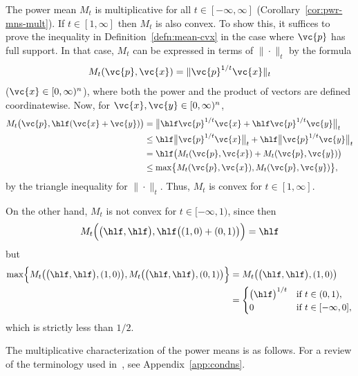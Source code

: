 \begin{example}
% 
The power mean $M_t$ is multiplicative for all $t \in [-\infty, \infty]$
(Corollary~\ref{cor:pwr-mns-mult}).  If $t \in [1, \infty]$ then $M_t$ is
also convex.  To show this, it suffices to prove the inequality in
Definition~\ref{defn:mean-cvx} in the case where $\vc{p}$ has full support.
In that case, $M_t$ can be expressed in terms of $\|\cdot\|_t$ by the
formula
\[
M_t(\vc{p}, \vc{x})
=
\| \vc{p}^{1/t} \vc{x} \|_t
\]
($\vc{x} \in [0, \infty)^n$), where both the power and the product of
  vectors are defined coordinatewise.  Now, for $\vc{x}, \vc{y} \in [0,
    \infty)^n$,
% 
\begin{align*}
M_t\bigl( \vc{p}, \hlf(\vc{x} + \vc{y}) \bigr)  &
=
\bigl\| \hlf \vc{p}^{1/t}\vc{x} + \hlf \vc{p}^{1/t}\vc{y} \bigr\|_t     \\
&
\leq
\hlf \bigl\| \vc{p}^{1/t} \vc{x} \bigr\|_t 
+
\hlf \bigl\| \vc{p}^{1/t} \vc{y} \bigr\|_t      \\
&
=
\hlf \bigl( M_t(\vc{p}, \vc{x}) + M_t(\vc{p}, \vc{y}) \bigr)    \\
&
\leq
\max \bigl\{ M_t(\vc{p}, \vc{x}), M_t(\vc{p}, \vc{y}) \bigr\},
\end{align*}
% 
by the triangle inequality for $\|\cdot\|_t$.  Thus, $M_t$ is convex for $t
\in [1, \infty]$.   

On the other hand, $M_t$ is not convex for $t \in [-\infty, 1)$, since then
\[
M_t \Bigl( 
\bigl( \hlf, \hlf \bigr),
\hlf \bigl( (1, 0) + (0, 1) \bigr) 
\Bigr)
=
\hlf
\]
but
% 
\begin{align*}
\max \Bigl\{
M_t \bigl( \bigl(\hlf, \hlf\bigr), (1, 0) \bigr),
M_t \bigl( \bigl(\hlf, \hlf\bigr), (0, 1) \bigr)
\Bigr\} &
=
M_t\bigl( \bigl(\hlf, \hlf\bigr), (1, 0) \bigr)   \\
&
=
\begin{cases}
\bigl( \hlf \bigr)^{1/t}        &\text{if } t \in (0, 1),       \\
0                               &\text{if } t \in [-\infty, 0],
\end{cases}
\end{align*}
% 
which is strictly less than $1/2$.
\end{example}

The multiplicative characterization of the power means is as follows.  For
a review of the terminology used in~, see
Appendix~\ref{app:condns}.

